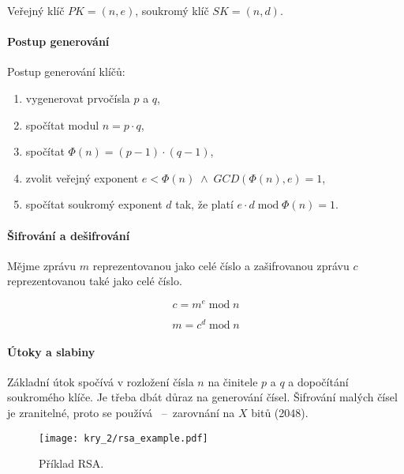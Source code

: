 \noindent Veřejný klíč $PK = (n, e)$, soukromý klíč $SK = (n, d)$.

\paragraph*{Postup generování} Postup generování klíčů: \begin{enumerate}
    \item vygenerovat prvočísla $p$ a $q$,
    \item spočítat modul $n = p \cdot q$,
    \item spočítat $\Phi(n) = (p-1) \cdot (q-1)$,
    \item zvolit veřejný exponent $e < \Phi(n) \; \land \;GCD(\Phi(n), e) = 1$,
    \item spočítat soukromý exponent $d$ tak, že platí $e \cdot d \; \text{mod} \; \Phi(n) = 1$.
\end{enumerate}

\paragraph*{Šifrování a dešifrování} Mějme zprávu $m$ reprezentovanou jako celé číslo a zašifrovanou zprávu $c$ reprezentovanou také jako celé číslo.

\begin{equation}
    c = m^e \; \text{mod} \; n
\end{equation}

\begin{equation}
    m = c^d \; \text{mod} \; n
\end{equation}

\paragraph*{Útoky a slabiny} Základní útok spočívá v rozložení čísla $n$ na činitele $p$ a $q$ a dopočítání soukromého klíče. Je třeba dbát důraz na generování čísel. Šifrování malých čísel je zranitelné, proto se používá ~--~zarovnání na $X$ bitů (2048).

\begin{figure}[H]
    \centering
    \texttt{[image: kry\_2/rsa\_example.pdf]}
    \caption{Příklad RSA.}
\end{figure}
